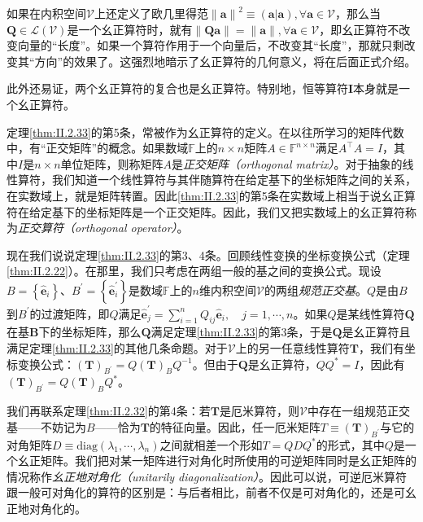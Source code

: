 \documentclass[main.tex]{subfiles}
\begin{document}
如果在内积空间$\mathcal{V}$上还定义了欧几里得范$\left\|\mathbf{a}\right\|^2\equiv\left(\mathbf{a}|\mathbf{a}\right),\forall\mathbf{a}\in\mathcal{V}$，那么当$\mathbf{Q}\in\mathcal{L}\left(\mathcal{V}\right)$是一个幺正算符时，就有$\left\|\mathbf{Qa}\right\|=\left\|\mathbf{a}\right\|,\forall\mathbf{a}\in\mathcal{V}$，即幺正算符不改变向量的“长度”。如果一个算符作用于一个向量后，不改变其“长度”，那就只剩改变其“方向”的效果了。这强烈地暗示了幺正算符的几何意义，将在后面正式介绍。

此外还易证，两个幺正算符的复合也是幺正算符。特别地，恒等算符$\mathbf{I}$本身就是一个幺正算符。

定理\ref{thm:II.2.33}的第5条，常被作为幺正算符的定义。在以往所学习的矩阵代数中，有“正交矩阵”的概念。如果数域$\mathbb{F}$上的$n\times n$矩阵$A\in\mathbb{F}^{n\times n}$满足$A^\intercal A=I$，其中$I$是$n\times n$单位矩阵，则称矩阵$A$是\emph{正交矩阵（orthogonal matrix）}。对于抽象的线性算符，我们知道一个线性算符与其伴随算符在给定基下的坐标矩阵之间的关系，在实数域上，就是矩阵转置。因此\ref{thm:II.2.33}的第5条在实数域上相当于说幺正算符在给定基下的坐标矩阵是一个正交矩阵。因此，我们又把实数域上的幺正算符称为\emph{正交算符（orthogonal operator）}。

现在我们说说定理\ref{thm:II.2.33}的第3、4条。回顾线性变换的坐标变换公式（定理\ref{thm:II.2.22}）。在那里，我们只考虑在两组一般的基之间的变换公式。现设$B=\left\{\mathbf{\hat{e}}_i\right\}$、$B^\prime=\left\{\mathbf{\hat{e}}^\prime_i\right\}$是数域$\mathbb{F}$上的$n$维内积空间$\mathcal{V}$的两组\emph{规范正交基}。$Q$是由$B$到$B^\prime$的过渡矩阵，即$Q$满足$\mathbf{\hat{e}}^\prime_j=\sum_{i=1}^nQ_{ij}\mathbf{\hat{e}}_i,\quad j=1,\cdots,n$。如果$Q$是某线性算符$\mathbf{Q}$在基$\mathbf{B}$下的坐标矩阵，那么$\mathbf{Q}$满足定理\ref{thm:II.2.33}的第3条，于是$\mathbf{Q}$是幺正算符且满足定理\ref{thm:II.2.33}的其他几条命题。对于$\mathcal{V}$上的另一任意线性算符$\mathbf{T}$，我们有坐标变换公式：$\left(\mathbf{T}\right)_{B^\prime}=Q\left(\mathbf{T}\right)_{B}Q^{-1}$。但由于$\mathbf{Q}$是幺正算符，$QQ^*=I$，因此有$\left(\mathbf{T}\right)_{B^\prime}=Q\left(\mathbf{T}\right)_{B}Q^*$。

我们再联系定理\ref{thm:II.2.32}的第4条：若$\mathbf{T}$是厄米算符，则$\mathcal{V}$中存在一组规范正交基——不妨记为$B$——恰为$\mathbf{T}$的特征向量。因此，任一厄米矩阵$T\equiv\left(\mathbf{T}\right)_{B^\prime}$与它的对角矩阵$D\equiv\mathrm{diag}\left(\lambda_1,\cdots,\lambda_n\right)$之间就相差一个形如$T=QDQ^*$的形式，其中$Q$是一个幺正矩阵\cite[\S 5.3 定理3.6]{周胜林2012线性代数}。我们把对某一矩阵进行对角化时所使用的可逆矩阵同时是幺正矩阵的情况称作\emph{幺正地对角化（unitarily diagonalization）}。因此可以说，可逆厄米算符跟一般可对角化的算符的区别是：与后者相比，前者不仅是可对角化的，还是可幺正地对角化的。
\end{document}
